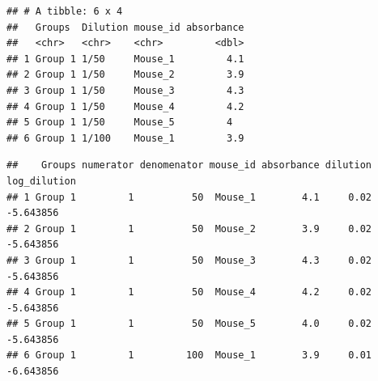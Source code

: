 \documentclass[
]{book}
\newenvironment{Shaded}{\begin{snugshade}}{\end{snugshade}}
\newcommand{\AttributeTok}[1]{\textcolor[rgb]{0.77,0.63,0.00}{#1}}
\newcommand{\CommentTok}[1]{\textcolor[rgb]{0.56,0.35,0.01}{\textit{#1}}}
\newcommand{\FunctionTok}[1]{\textcolor[rgb]{0.00,0.00,0.00}{#1}}
\newcommand{\NormalTok}[1]{#1}
\newcommand{\OtherTok}[1]{\textcolor[rgb]{0.56,0.35,0.01}{#1}}
\newcommand{\SpecialCharTok}[1]{\textcolor[rgb]{0.00,0.00,0.00}{#1}}
\newcommand{\StringTok}[1]{\textcolor[rgb]{0.31,0.60,0.02}{#1}}
\begin{document}
\begin{verbatim}
## # A tibble: 6 x 4
##   Groups  Dilution mouse_id absorbance
##   <chr>   <chr>    <chr>         <dbl>
## 1 Group 1 1/50     Mouse_1         4.1
## 2 Group 1 1/50     Mouse_2         3.9
## 3 Group 1 1/50     Mouse_3         4.3
## 4 Group 1 1/50     Mouse_4         4.2
## 5 Group 1 1/50     Mouse_5         4  
## 6 Group 1 1/100    Mouse_1         3.9
\end{verbatim}

\begin{Shaded}
\end{Shaded}

\begin{verbatim}
##    Groups numerator denomenator mouse_id absorbance dilution log_dilution
## 1 Group 1         1          50  Mouse_1        4.1     0.02    -5.643856
## 2 Group 1         1          50  Mouse_2        3.9     0.02    -5.643856
## 3 Group 1         1          50  Mouse_3        4.3     0.02    -5.643856
## 4 Group 1         1          50  Mouse_4        4.2     0.02    -5.643856
## 5 Group 1         1          50  Mouse_5        4.0     0.02    -5.643856
## 6 Group 1         1         100  Mouse_1        3.9     0.01    -6.643856
\end{verbatim}
\end{document}
